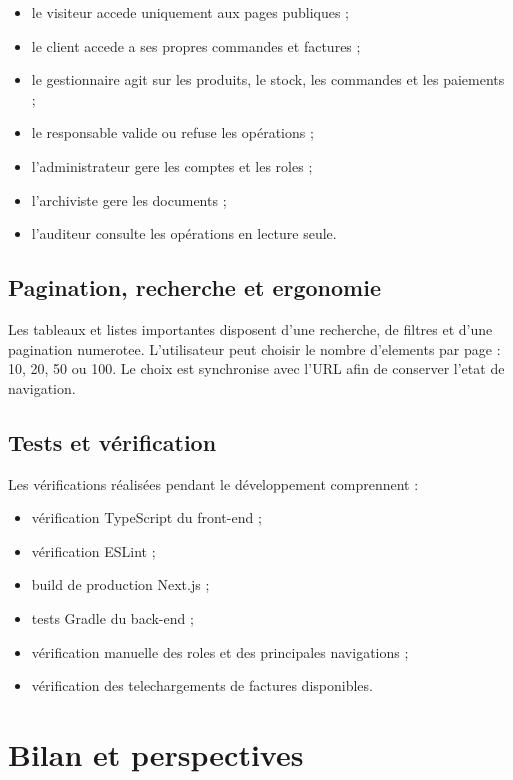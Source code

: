 \documentclass[12pt,a4paper]{report}
\begin{document}
\begin{itemize}
  \item le visiteur accede uniquement aux pages publiques ;
  \item le client accede a ses propres commandes et factures ;
  \item le gestionnaire agit sur les produits, le stock, les commandes et les paiements ;
  \item le responsable valide ou refuse les opérations ;
  \item l'administrateur gere les comptes et les roles ;
  \item l'archiviste gere les documents ;
  \item l'auditeur consulte les opérations en lecture seule.
\end{itemize}

\section{Pagination, recherche et ergonomie}

Les tableaux et listes importantes disposent d'une recherche, de filtres et d'une pagination numerotee. L'utilisateur peut choisir le nombre d'elements par page : 10, 20, 50 ou 100. Le choix est synchronise avec l'URL afin de conserver l'etat de navigation.

\section{Tests et vérification}

Les vérifications réalisées pendant le développement comprennent :

\begin{itemize}
  \item vérification TypeScript du front-end ;
  \item vérification ESLint ;
  \item build de production Next.js ;
  \item tests Gradle du back-end ;
  \item vérification manuelle des roles et des principales navigations ;
  \item vérification des telechargements de factures disponibles.
\end{itemize}

\chapter{Bilan et perspectives}
\end{document}
